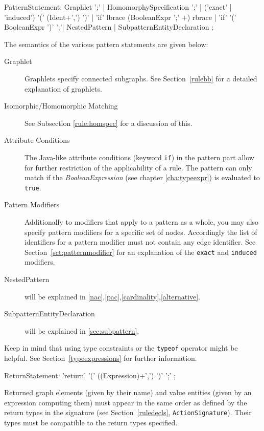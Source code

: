 \begin{rail}
  PatternStatement:
    Graphlet ';' |
    HomomorphySpecification ';' |
    ('exact' | 'induced') '(' (Ident+',') ')' |
    'if' lbrace (BooleanExpr ';' +) rbrace |
    'if' '(' BooleanExpr ')' ';'|
    NestedPattern |
    SubpatternEntityDeclaration
    ;
\end{rail}
The semantics of the various pattern statements are given below:
\begin{description}
  \item[Graphlet] Graphlets specify connected subgraphs. See Section~\ref{rulebb} for a detailed explanation of graphlets.
  \item[Isomorphic/Homomorphic Matching] See Subsection \ref{rule:homspec} for a discussion of this.
  \item[Attribute Conditions] The Java-like attribute conditions (keyword \texttt{if}) in the pattern part allow for further restriction of the applicability of a rule. The pattern can only match if the \emph{BooleanExpression} (see chapter \ref{cha:typeexpr}) is evaluated to \texttt{true}.
  \item[Pattern Modifiers] Additionally to modifiers that apply to a pattern as a whole, you may also specify pattern modifiers for a specific set of nodes. Accordingly the list of identifiers for a pattern modifier must not contain any edge identifier. See Section~\ref{sct:patternmodifier} for an explanation of the \texttt{exact} and \texttt{induced} modifiers.
  \item[NestedPattern] will be explained in \ref{nac},\ref{pac},\ref{cardinality},\ref{alternative}.
  \item[SubpatternEntityDeclaration] will be explained in \ref{sec:subpattern}.
\end{description}

Keep in mind that using type constraints or the \texttt{typeof} operator might be helpful. See Section~\ref{typeexpressions} for further information.

\begin{rail}
  ReturnStatement: 'return' '(' ((Expression)+',') ')' ';' ;
\end{rail}
Returned graph elements (given by their name) and value entities (given by an expression computing them) must appear in the same order as defined by the return types in the signature (see Section~\ref{ruledecls}, \texttt{ActionSignature}).
Their types must be compatible to the return types specified.

